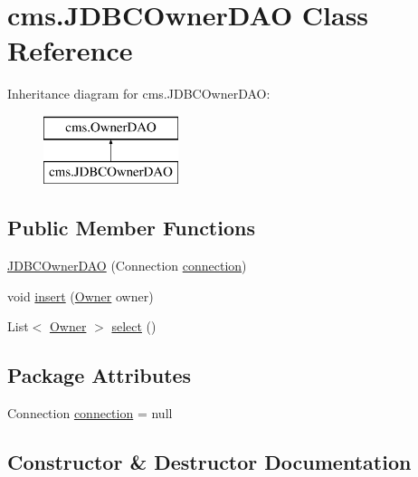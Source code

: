 \hypertarget{classcms_1_1_j_d_b_c_owner_d_a_o}{}\section{cms.\+J\+D\+B\+C\+Owner\+D\+AO Class Reference}
\label{classcms_1_1_j_d_b_c_owner_d_a_o}
Inheritance diagram for cms.\+J\+D\+B\+C\+Owner\+D\+AO\+:\begin{figure}[H]
\begin{center}
\leavevmode
\includegraphics[height=2.000000cm]{classcms_1_1_j_d_b_c_owner_d_a_o}
\end{center}
\end{figure}
\subsection*{Public Member Functions}
\begin{DoxyCompactItemize}
\item 
\mbox{\hyperlink{classcms_1_1_j_d_b_c_owner_d_a_o_a19efe157fb825f3acec6cc3c1d99cd49}{J\+D\+B\+C\+Owner\+D\+AO}} (Connection \mbox{\hyperlink{classcms_1_1_j_d_b_c_owner_d_a_o_a76b8cb63ccf288ce8ca2f767a045372c}{connection}})
\item 
void \mbox{\hyperlink{classcms_1_1_j_d_b_c_owner_d_a_o_ad0540f3f132d78562a11afe2bf30cd29}{insert}} (\mbox{\hyperlink{classcms_1_1_owner}{Owner}} owner)
\item 
List$<$ \mbox{\hyperlink{classcms_1_1_owner}{Owner}} $>$ \mbox{\hyperlink{classcms_1_1_j_d_b_c_owner_d_a_o_a81952fce2cc39e648eb048d76bfb048d}{select}} ()
\end{DoxyCompactItemize}
\subsection*{Package Attributes}
\begin{DoxyCompactItemize}
\item 
Connection \mbox{\hyperlink{classcms_1_1_j_d_b_c_owner_d_a_o_a76b8cb63ccf288ce8ca2f767a045372c}{connection}} = null
\end{DoxyCompactItemize}


\subsection{Constructor \& Destructor Documentation}
\mbox{\label{classcms_1_1_j_d_b_c_owner_d_a_o_a19efe157fb825f3acec6cc3c1d99cd49}} 
